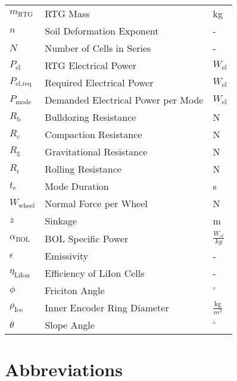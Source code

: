 \begin{longtable}[l]{lll}
$m_\text{RTG}$			&	RTG Mass									& kg							\\
\(n\)					&	Soil Deformation Exponent					& -								\\
$N$						&	Number of Cells in Series					& -								\\
$P_\text{el}$			&	RTG Electrical Power						& $W_\text{el}$					\\
$P_\text{el,req}$		&	Required Electrical Power					& $W_\text{el}$					\\
$P_\text{mode}$			&	Demanded Electrical Power per Mode			& $W_\text{el}$					\\
\(R_\text{b}\)			&	Bulldozing Resistance						& N								\\
\(R_\text{c}\)			&	Compaction Resistance						& N								\\
\(R_\text{g}\)			&	Gravitational Resistance					& N								\\
\(R_\text{r}\)			&	Rolling Resistance							& N								\\
$t_\text{e}$			&	Mode Duration								& s								\\
\(W_\text{wheel}\)		&	Normal Force per Wheel						& N								\\
\(z\)					&	Sinkage										& m								\\




$\alpha_\text{BOL}$		&	BOL Specific Power							& $\frac{W_{el}}{kg}$			\\
\(\epsilon\)			&	Emissivity 									&	-							\\
$\eta_\text{LiIon}$		&	Efficiency of LiIon Cells					& -								\\
\(\phi\)				&	Friciton Angle								& \(^\circ\)					\\
\(\rho_\text{Ice}\)		&	Inner Encoder Ring Diameter  				&	\(\frac{\text{kg}}{m^3}\)	\\
\(\theta\)				&	Slope Angle									& \(^\circ\)					\\






\end{longtable}

\chapter*{Abbreviations}


